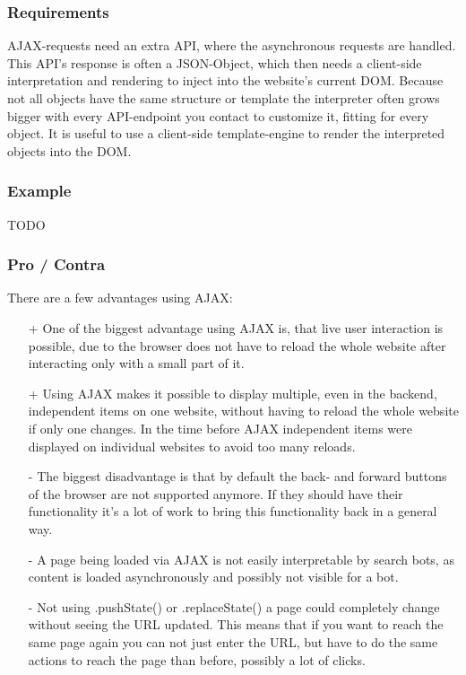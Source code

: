 \documentclass[f,bachelor,binding,twoside,palatino]{WeSTthesis}
\def \ajax {AJAX}
\begin{document}
    \subsubsection{Requirements}
    \ajax{}-requests need an extra API, where the asynchronous requests are handled.
    This API's response is often a JSON-Object, which then needs a client-side interpretation and rendering to inject into the website's current DOM.
    Because not all objects have the same structure or template the interpreter often grows bigger with every API-endpoint you contact to customize it, fitting for every object.
    It is useful to use a client-side template-engine to render the interpreted objects into the DOM.

    \subsubsection{Example}
    TODO

    \subsubsection{Pro / Contra}
  	  There are a few advantages using \ajax{}:
  	  \begin{itemize}
        \item[+]{One of the biggest advantage using \ajax{} is, that live user interaction is possible, due to the browser does not have to reload the whole website after interacting only with a small part of it.}
  	    \item[+]{Using \ajax{} makes it possible to display multiple, even in the backend, independent items on one website, without having to reload the whole website if only one changes.
  	    In the time before \ajax{} independent items were displayed on individual websites to avoid too many reloads.}
  	    \item[-]{The biggest disadvantage is that by default the back- and forward buttons of the browser are not supported anymore.
  	    If they should have their functionality it's a lot of work to bring this functionality back in a general way.}
  	    \item[-]{A page being loaded via \ajax{} is not easily interpretable by search bots, as content is loaded asynchronously and possibly not visible for a bot.}
  	    \item[-]{Not using .pushState() or .replaceState() a page could completely change without seeing the URL updated.
  	    This means that if you want to reach the same page again you can not just enter the URL, but have to do the same actions to reach the page than before, possibly a lot of clicks.}
  	  \end{itemize}
\end{document}
